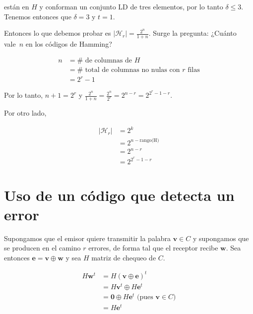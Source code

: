 \documentclass[10pt,a4paper]{article}
\begin{document}
están en $H$ y conforman un conjunto LD de tres elementos, por lo tanto $\delta \leq 3$. Tenemos entonces que $\delta = 3$ y $t = 1$.

Entonces lo que debemos probar es $\lvert \mathcal{H}_r\rvert = \frac{2^n}{1 + n}$. Surge la pregunta: ¿Cuánto vale $n$ en los códigos de Hamming?

\begin{center}
\begin{align*} n &= \# \text{ de columnas de } H\\ &= \#\text{ total de columnas no nulas con } r \text{ filas}\\ &= 2^r - 1 \end{align*}
\end{center}

Por lo tanto, $n + 1 = 2 ^r$ y $\frac{2^n}{1+n} = \frac{2^n}{2^r} = 2^{n - r} = 2^{2^r -1 -r}$.

Por otro lado,

\begin{center}
\begin{align*} \lvert \mathcal{H}_r \rvert &= 2^k\\ &= 2^{n-\text{rango(H)}}\\ &= 2^{n -r}\\ &= 2^{2^r - 1 -r} \end{align*}
\end{center}

\section*{Uso de un código que detecta un error}

Supongamos que el emisor quiere transmitir la palabra $\textbf{v} \in C$ y supongamos que se producen en el camino $r$ errores, de forma tal que el receptor recibe $\textbf{w}$. Sea entonces $\textbf{e} = \textbf{v} \oplus \textbf{w}$ y sea $H$ matriz de chequeo de $C$.

\begin{center}
\begin{align*}
H\textbf{w}^t&=H(\textbf{v} \oplus \textbf{e})^t\\
&= H\textbf{v}^t \oplus H \textbf{e}^t\\
&= \textbf{0} \oplus H\textbf{e}^t \text{ (pues }\textbf{v} \in C\text{)}\\
&= H\textbf{e}^t
\end{align*}
\end{center}
\end{document}

